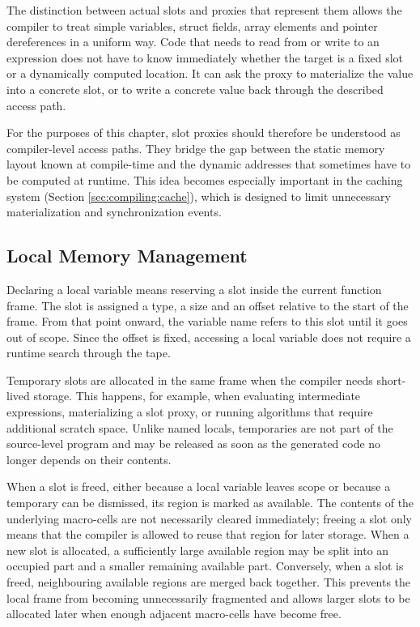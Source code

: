 The distinction between actual slots and proxies that represent them allows the compiler to treat simple variables, struct fields, array elements and pointer dereferences in a uniform way. Code that needs to read from or write to an expression does not have to know immediately whether the target is a fixed slot or a dynamically computed location. It can ask the proxy to materialize the value into a concrete slot, or to write a concrete value back through the described access path.

For the purposes of this chapter, slot proxies should therefore be understood as compiler-level access paths. They bridge the gap between the static memory layout known at compile-time and the dynamic addresses that sometimes have to be computed at runtime. This idea becomes especially important in the caching system (Section \ref{sec:compiling:cache}), which is designed to limit unnecessary materialization and synchronization events.

\subsection{Local Memory Management}
Declaring a local variable means reserving a slot inside the current function frame. The slot is assigned a type, a size and an offset relative to the start of the frame. From that point onward, the variable name refers to this slot until it goes out of scope. Since the offset is fixed, accessing a local variable does not require a runtime search through the tape.

Temporary slots are allocated in the same frame when the compiler needs short-lived storage. This happens, for example, when evaluating intermediate expressions, materializing a slot proxy, or running algorithms that require additional scratch space. Unlike named locals, temporaries are not part of the source-level program and may be released as soon as the generated code no longer depends on their contents.

When a slot is freed, either because a local variable leaves scope or because a temporary can be dismissed, its region is marked as available. The contents of the underlying macro-cells are not necessarily cleared immediately; freeing a slot only means that the compiler is allowed to reuse that region for later storage. When a new slot is allocated, a sufficiently large available region may be split into an occupied part and a smaller remaining available part. Conversely, when a slot is freed, neighbouring available regions are merged back together. This prevents the local frame from becoming unnecessarily fragmented and allows larger slots to be allocated later when enough adjacent macro-cells have become free.

